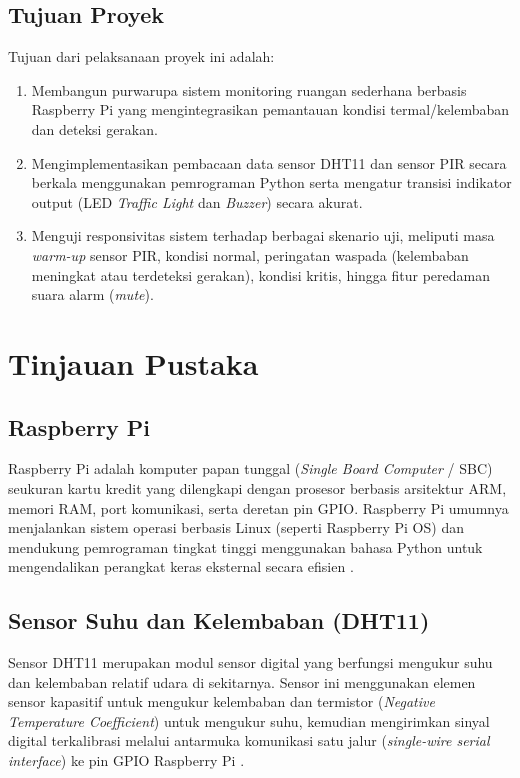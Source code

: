 \documentclass[12pt, a4paper]{article}
\begin{document}
\subsection{Tujuan Proyek}
Tujuan dari pelaksanaan proyek ini adalah:
\begin{enumerate}
    \item Membangun purwarupa sistem monitoring ruangan sederhana berbasis Raspberry Pi yang mengintegrasikan pemantauan kondisi 
    termal/kelembaban dan deteksi gerakan.
    \item Mengimplementasikan pembacaan data sensor DHT11 dan sensor PIR secara berkala menggunakan pemrograman Python serta 
    mengatur transisi indikator output (LED \textit{Traffic Light} dan \textit{Buzzer}) secara akurat.
    \item Menguji responsivitas sistem terhadap berbagai skenario uji, meliputi masa \textit{warm-up} sensor PIR, kondisi normal, 
    peringatan waspada (kelembaban meningkat atau terdeteksi gerakan), kondisi kritis, hingga fitur peredaman suara alarm 
    (\textit{mute}).
\end{enumerate}

\section{Tinjauan Pustaka}
\subsection{Raspberry Pi}
Raspberry Pi adalah komputer papan tunggal (\textit{Single Board Computer} / SBC) seukuran kartu kredit yang dilengkapi dengan
 prosesor berbasis arsitektur ARM, memori RAM, port komunikasi, serta deretan pin GPIO. Raspberry Pi umumnya menjalankan sistem 
 operasi berbasis Linux (seperti Raspberry Pi OS) dan mendukung pemrograman tingkat tinggi menggunakan bahasa Python untuk 
 mengendalikan perangkat keras eksternal secara efisien \cite{rpidoc,gpiozero}.

\subsection{Sensor Suhu dan Kelembaban (DHT11)}
Sensor DHT11 merupakan modul sensor digital yang berfungsi mengukur suhu dan kelembaban relatif udara di sekitarnya. Sensor ini 
menggunakan elemen sensor kapasitif untuk mengukur kelembaban dan termistor (\textit{Negative Temperature Coefficient}) untuk 
mengukur suhu, kemudian mengirimkan sinyal digital terkalibrasi melalui antarmuka komunikasi satu jalur (\textit{single-wire 
serial interface}) ke pin GPIO Raspberry Pi \cite{dht11,adafruitdht}.
\end{document}
